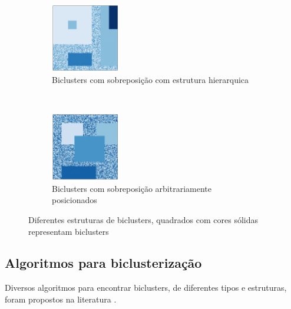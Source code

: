 \documentclass[normaltoc, espacoumemeio, pnumromarab,ruledheader]{abnt}
\begin{document}
\begin{figure}[h]
        ~
        \centering
        \begin{subfigure}[b]{0.3\textwidth}
                \includegraphics[width=30mm]{img/h-bic-struct.png}
                \caption{Biclusters com sobreposição com estrutura hierarquica}
                \label{fig:bicstruct-h}
        \end{subfigure}
        ~
        \centering
        \begin{subfigure}[b]{0.3\textwidth}
                \includegraphics[width=30mm]{img/i-bic-struct.png}
                \caption{Biclusters com sobreposição arbitrariamente posicionados}
                \label{fig:bicstruct-i}
        \end{subfigure}
        \caption{Diferentes estruturas de biclusters, quadrados com cores sólidas representam biclusters} %
        \label{fig:bicstruct}
    \end{figure}
    
    \subsection{Algoritmos para biclusterização}

    Diversos algoritmos para encontrar biclusters, de diferentes tipos e estruturas, foram propostos na literatura \cite{Tanay2005,Madeira2004}.
    
\end{document}
